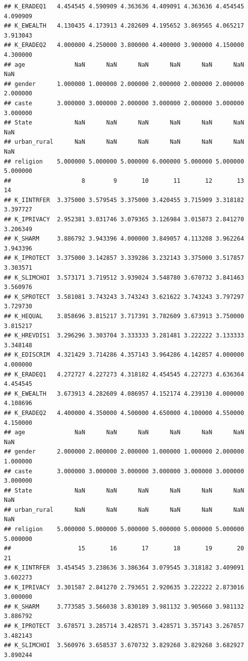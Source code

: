 \documentclass[
]{article}
\begin{document}
\begin{verbatim}
## K_ERADEQ1   4.454545 4.590909 4.363636 4.409091 4.363636 4.454545 4.090909
## K_EWEALTH   4.130435 4.173913 4.282609 4.195652 3.869565 4.065217 3.913043
## K_ERADEQ2   4.000000 4.250000 3.800000 4.400000 3.900000 4.150000 4.300000
## age              NaN      NaN      NaN      NaN      NaN      NaN      NaN
## gender      1.000000 1.000000 2.000000 2.000000 2.000000 2.000000 2.000000
## caste       3.000000 3.000000 2.000000 3.000000 2.000000 3.000000 3.000000
## State            NaN      NaN      NaN      NaN      NaN      NaN      NaN
## urban_rural      NaN      NaN      NaN      NaN      NaN      NaN      NaN
## religion    5.000000 5.000000 5.000000 6.000000 5.000000 5.000000 5.000000
##                    8        9       10       11       12       13       14
## K_IINTRFER  3.375000 3.579545 3.375000 3.420455 3.715909 3.318182 3.397727
## K_IPRIVACY  2.952381 3.031746 3.079365 3.126984 3.015873 2.841270 3.206349
## K_SHARM     3.886792 3.943396 4.000000 3.849057 4.113208 3.962264 3.943396
## K_IPROTECT  3.375000 3.142857 3.339286 3.232143 3.375000 3.517857 3.303571
## K_SLIMCHOI  3.573171 3.719512 3.939024 3.548780 3.670732 3.841463 3.560976
## K_SPROTECT  3.581081 3.743243 3.743243 3.621622 3.743243 3.797297 3.729730
## K_HEQUAL    3.858696 3.815217 3.717391 3.782609 3.673913 3.750000 3.815217
## K_HREVDIS1  3.296296 3.303704 3.333333 3.281481 3.222222 3.133333 3.348148
## K_EDISCRIM  4.321429 3.714286 4.357143 3.964286 4.142857 4.000000 4.000000
## K_ERADEQ1   4.272727 4.227273 4.318182 4.454545 4.227273 4.636364 4.454545
## K_EWEALTH   3.673913 4.282609 4.086957 4.152174 4.239130 4.000000 4.108696
## K_ERADEQ2   4.400000 4.350000 4.500000 4.650000 4.100000 4.550000 4.150000
## age              NaN      NaN      NaN      NaN      NaN      NaN      NaN
## gender      2.000000 2.000000 2.000000 1.000000 1.000000 2.000000 1.000000
## caste       3.000000 3.000000 3.000000 3.000000 3.000000 3.000000 3.000000
## State            NaN      NaN      NaN      NaN      NaN      NaN      NaN
## urban_rural      NaN      NaN      NaN      NaN      NaN      NaN      NaN
## religion    5.000000 5.000000 5.000000 5.000000 5.000000 5.000000 5.000000
##                   15       16       17       18       19       20       21
## K_IINTRFER  3.454545 3.238636 3.386364 3.079545 3.318182 3.409091 3.602273
## K_IPRIVACY  3.301587 2.841270 2.793651 2.920635 3.222222 2.873016 3.000000
## K_SHARM     3.773585 3.566038 3.830189 3.981132 3.905660 3.981132 3.886792
## K_IPROTECT  3.678571 3.285714 3.428571 3.428571 3.357143 3.267857 3.482143
## K_SLIMCHOI  3.560976 3.658537 3.670732 3.829268 3.829268 3.682927 3.890244

\end{verbatim}
\end{document}
